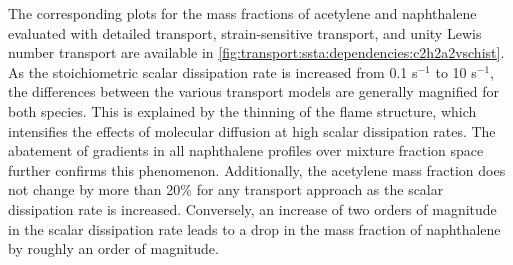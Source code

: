 The corresponding plots for the mass fractions of acetylene and naphthalene evaluated with detailed transport, strain-sensitive transport, and unity Lewis number transport are available in \cref{fig:transport:ssta:dependencies:c2h2a2vschist}. As the stoichiometric scalar dissipation rate is increased from 0.1 s$^{-1}$ to 10 s$^{-1}$, the differences between the various transport models are generally magnified for both species. This is explained by the thinning of the flame structure, which intensifies the effects of molecular diffusion at high scalar dissipation rates. The abatement of gradients in all naphthalene profiles over mixture fraction space further confirms this phenomenon. Additionally, the acetylene mass fraction does not change by more than 20\% for any transport approach as the scalar dissipation rate is increased. Conversely, an increase of two orders of magnitude in the scalar dissipation rate leads to a drop in the mass fraction of naphthalene by roughly an order of magnitude.

